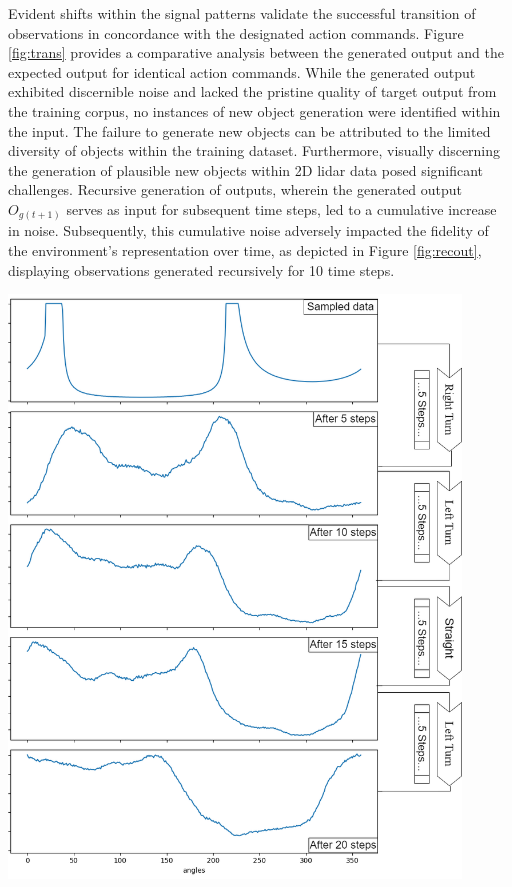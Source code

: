 \documentclass[12pt,twoside,a4paper,parskip]{scrbook} %
\begin{document}
Evident shifts within the signal patterns validate the successful transition of observations in concordance with the designated action commands. Figure \ref{fig:trans} provides a comparative analysis between the generated output and the expected output for identical action commands.
While the generated output exhibited discernible noise and lacked the pristine quality of target output from the training corpus, no instances of new object generation were identified within the input.
The failure to generate new objects can be attributed to the limited diversity of objects within the training dataset. Furthermore, visually discerning the generation of plausible new objects within 2D lidar data posed significant challenges.
Recursive generation of outputs, wherein the generated output $O_{g(t+1)}$ serves as input for subsequent time steps, led to a cumulative increase in noise. Subsequently, this cumulative noise adversely impacted the fidelity of the environment's representation over time, as depicted in Figure \ref{fig:recout}, displaying observations generated recursively for 10 time steps.

\begin{minipage}[t]{\linewidth}
        \centering
        \includegraphics[width=0.9\textwidth]{Images/recout.png}
        \label{fig:recout}
        \vspace{-\baselineskip} %
    \end{minipage}
    \hfill
\end{document}
